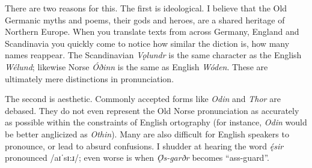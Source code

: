       There are two reasons for this.  The first is ideological.  I believe that the Old Germanic myths and poems, their gods and heroes, are a shared heritage of Northern Europe.  When you translate texts from across Germany, England and Scandinavia you quickly come to notice how similar the diction is, how many names reappear. The Scandinavian \emph{Vǫlundr} is the same character as the English \emph{Wélund}; likewise Norse \emph{Óðinn} is the same as English \emph{Wóden}.  These are ultimately mere distinctions in pronunciation.

      The second is aesthetic.  Commonly accepted forms like \emph{Odin} and \emph{Thor} are debased.  They do not even represent the Old Norse pronunciation as accurately as possible within the constraints of English ortography (for instance, \emph{Odin} would be better anglicized as \emph{Othin}).  Many are also difficult for English speakers to pronounce, or lead to absurd confusions.  I shudder at hearing the word \emph{ę́sir} pronounced /aɪˈsɪ:ɹ/; even worse is when \emph{Ǫ́s-garðr} becomes “ass-guard”.
